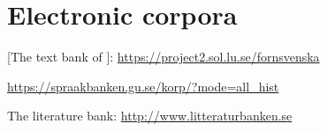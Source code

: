 \documentclass[output=paper]{langscibook}
\begin{document}
\section*{Electronic corpora}
\begin{description}[font=\normalfont]
\item[FTB:]  [The text bank of ]:  \url{https://project2.sol.lu.se/fornsvenska} 
\item[\isi{Korp}:] \url{https://spraakbanken.gu.se/korp/?mode=all_hist}
\item[LB:] The  literature bank: \url{http://www.litteraturbanken.se}
\end{description}

{\sloppy\printbibliography[heading=subbibliography,notkeyword=this]}
\end{document}
